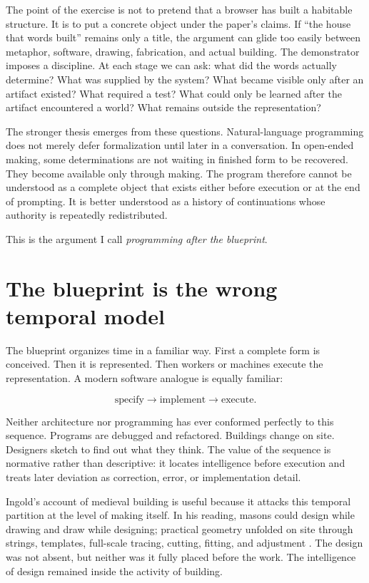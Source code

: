 \documentclass[11pt]{article}
\begin{document}
The point of the exercise is not to pretend that a browser has built a habitable structure. It is to put a concrete object under the paper's claims. If ``the house that words built'' remains only a title, the argument can glide too easily between metaphor, software, drawing, fabrication, and actual building. The demonstrator imposes a discipline. At each stage we can ask: what did the words actually determine? What was supplied by the system? What became visible only after an artifact existed? What required a test? What could only be learned after the artifact encountered a world? What remains outside the representation?

The stronger thesis emerges from these questions. Natural-language programming does not merely defer formalization until later in a conversation. In open-ended making, some determinations are not waiting in finished form to be recovered. They become available only through making. The program therefore cannot be understood as a complete object that exists either before execution or at the end of prompting. It is better understood as a history of continuations whose authority is repeatedly redistributed.

This is the argument I call \emph{programming after the blueprint}.

\section{The blueprint is the wrong temporal model}

The blueprint organizes time in a familiar way. First a complete form is conceived. Then it is represented. Then workers or machines execute the representation. A modern software analogue is equally familiar:

\[
\text{specify} \rightarrow \text{implement} \rightarrow \text{execute}.
\]

Neither architecture nor programming has ever conformed perfectly to this sequence. Programs are debugged and refactored. Buildings change on site. Designers sketch to find out what they think. The value of the sequence is normative rather than descriptive: it locates intelligence before execution and treats later deviation as correction, error, or implementation detail.

Ingold's account of medieval building is useful because it attacks this temporal partition at the level of making itself. In his reading, masons could design while drawing and draw while designing; practical geometry unfolded on site through strings, templates, full-scale tracing, cutting, fitting, and adjustment \citep[54--56]{ingold2013making}. The design was not absent, but neither was it fully placed before the work. The intelligence of design remained inside the activity of building.
\end{document}
